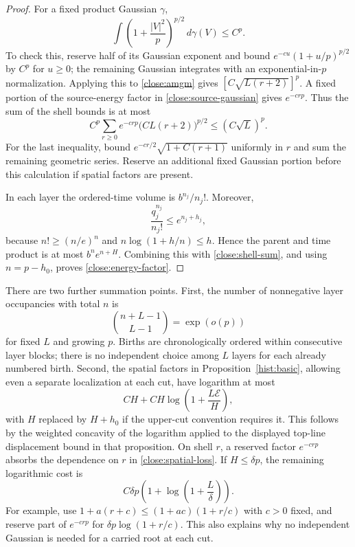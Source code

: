 \begin{proof}
For a fixed product Gaussian $\gamma$,
\[
 \int\left(1+\frac{|V|^2}{p}\right)^{p/2}\,d\gamma(V)
 \leq C^p.
\]
To check this, reserve half of its Gaussian exponent and bound
$e^{-c u}(1+u/p)^{p/2}$ by $C^p$ for $u\geq0$; the remaining
Gaussian integrates with an exponential-in-$p$ normalization.
Applying this to \eqref{close:amgm} gives
$[C\sqrt{L(r+2)}]^p$. A fixed portion of the source-energy
factor in \eqref{close:source-gaussian} gives $e^{-crp}$.
Thus the sum of the shell bounds is at most
\begin{equation}\label{close:shell-sum}
 C^p\sum_{r\geq0}e^{-crp}
 \bigl(C L(r+2)\bigr)^{p/2}
 \leq (C\sqrt L)^p.
\end{equation}
For the last inequality, bound
$e^{-cr/2}\sqrt{1+C(r+1)}$ uniformly in $r$ and sum the remaining
geometric series. Reserve an additional fixed Gaussian portion
before this calculation if spatial factors are present.

In each layer the ordered-time volume is $b^{n_j}/n_j!$. Moreover,
\[
 \frac{q_j^{n_j}}{n_j!}\leq e^{n_j+h_j},
\]
because $n!\geq(n/e)^n$ and
$n\log(1+h/n)\leq h$. Hence the parent and time product is at most
$b^n e^{n+H}$. Combining this with \eqref{close:shell-sum}, and
using $n=p-h_0$, proves \eqref{close:energy-factor}.
\end{proof}

There are two further summation points. First, the number of
nonnegative layer occupancies with total $n$ is
\begin{equation}\label{close:layer-count}
 \binom{n+L-1}{L-1}=\exp(o(p))
\end{equation}
for fixed $L$ and growing $p$. Births are chronologically ordered
within consecutive layer blocks; there is no independent choice
among $L$ layers for each already numbered birth. Second, the
spatial factors in Proposition~\ref{hist:basic}, allowing even a
separate localization at each cut, have logarithm at most
\begin{equation}\label{close:spatial-loss}
 C H+C H\log\left(1+\frac{L\mathcal E}{H}\right),
\end{equation}
with $H$ replaced by $H+h_0$ if the upper-cut convention requires
it. This follows by the weighted concavity of the logarithm
applied to the displayed top-line displacement bound in that
proposition. On shell $r$, a reserved factor $e^{-crp}$ absorbs
the dependence on $r$ in \eqref{close:spatial-loss}. If
$H\leq\delta p$, the remaining logarithmic cost is
\begin{equation}\label{close:spatial-small}
 C\delta p\left(1+\log\left(1+\frac L\delta\right)\right).
\end{equation}
For example, use
$1+a(r+c)\leq(1+ac)(1+r/c)$ with $c>0$ fixed, and reserve part
of $e^{-crp}$ for $\delta p\log(1+r/c)$. This also explains why
no independent Gaussian is needed for a carried root at each cut.

